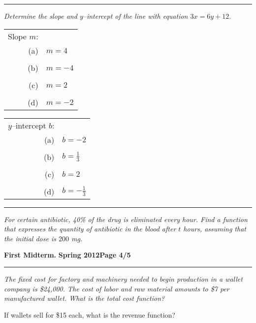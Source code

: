 \documentclass[12pt]{article}
\begin{document}
\vspace{2cm}
\hrule
{\problem[10 pts] \em Determine the slope and $y$--intercept of the
  line with equation $3x=6y+12.$}
\begin{tabular}{rl}
Slope $m$: \\
(a) & $m=4$ \\ \\
(b) & $m=-4$ \\ \\
(c) &$m=2$ \\ \\
(d) &$m=-2$
\end{tabular} \hspace{3cm}
\begin{tabular}{rl}
$y$--intercept $b$: \\
(a) & $b=-2$ \\ \\
(b) &$b=\tfrac{1}{3}$ \\ \\
(c) &$b=2$ \\ \\
(d) &$b=-\tfrac{1}{3}$
\end{tabular}
\vspace{3.5cm}
\hrule
{\problem[10 pts] \em For certain antibiotic, 40\% of the drug is
  eliminated every hour.  Find a function that expresses the quantity
  of antibiotic in the blood after $t$ hours, assuming that the
  initial dose is $200$ mg.}
\vspace{3.5cm}
\begin{flushright}
\end{flushright}
\newpage

\hfill{\large\bf First Midterm.}\hfill{\large\bf
  Spring 2012}\hfill{\large\bf Page 4/5}\hrule

\bigskip
{\problem[15 pts] \em The fixed cost for factory and machinery needed
  to begin production in a wallet company is \$24,000.  The cost of
  labor and raw material amounts to \$7 per manufactured wallet.
  What is the total cost function?}
\vspace{1cm}

\begin{flushright}
\end{flushright}
\noindent
If wallets sell for \$15 each, what is the revenue function?
\vspace{1cm}
\end{document}
